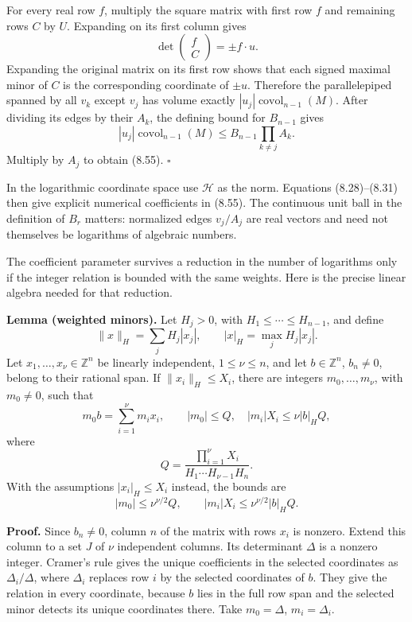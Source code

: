 \documentclass[
  11pt,
  a4paper,
]{article}
\begin{document}
For every real row \(f\), multiply the square matrix with first row
\(f\) and remaining rows \(C\) by \(U\). Expanding on its first column
gives \[
\det\begin{pmatrix}f\\C\end{pmatrix}
=\pm f\cdot u.
\] Expanding the original matrix on its first row shows that each signed
maximal minor of \(C\) is the corresponding coordinate of \(\pm u\).
Therefore the parallelepiped spanned by all \(v_k\) except \(v_j\) has
volume exactly \(|u_j|\operatorname{covol}_{n-1}(M)\). After dividing
its edges by their \(A_k\), the defining bound for \(B_{n-1}\) gives \[
|u_j|\operatorname{covol}_{n-1}(M)
\le B_{n-1}\prod_{k\ne j}A_k.
\] Multiply by \(A_j\) to obtain (8.55). \(\square\)

In the logarithmic coordinate space use \(\mathcal H\) as the norm.
Equations (8.28)--(8.31) then give explicit numerical coefficients in
(8.55). The continuous unit ball in the definition of \(B_r\) matters:
normalized edges \(v_j/A_j\) are real vectors and need not themselves be
logarithms of algebraic numbers.

The coefficient parameter survives a reduction in the number of
logarithms only if the integer relation is bounded with the same
weights. Here is the precise linear algebra needed for that reduction.

\textbf{Lemma (weighted minors).} Let \(H_j>0\), with
\(H_1\le\cdots\le H_{n-1}\), and define \[
\|x\|_H=\sum_jH_j|x_j|,\qquad
|x|_H=\max_jH_j|x_j|.
\] Let \(x_1,\ldots,x_\nu\in\mathbb Z^n\) be linearly independent,
\(1\le\nu\le n\), and let \(b\in\mathbb Z^n\), \(b_n\ne0\), belong to
their rational span. If \(\|x_i\|_H\le X_i\), there are integers
\(m_0,\ldots,m_\nu\), with \(m_0\ne0\), such that \[
m_0b=\sum_{i=1}^\nu m_ix_i,\qquad
|m_0|\le Q,\quad |m_i|X_i\le\nu|b|_H Q,
\] where \[
Q=\frac{\prod_{i=1}^\nu X_i}{H_1\cdots H_{\nu-1}H_n}.
\] With the assumptions \(|x_i|_H\le X_i\) instead, the bounds are \[
|m_0|\le\nu^{\nu/2}Q,\qquad
|m_i|X_i\le\nu^{\nu/2}|b|_H Q.
\]

\textbf{Proof.} Since \(b_n\ne0\), column \(n\) of the matrix with rows
\(x_i\) is nonzero. Extend this column to a set \(J\) of \(\nu\)
independent columns. Its determinant \(\Delta\) is a nonzero integer.
Cramer's rule gives the unique coefficients in the selected coordinates
as \(\Delta_i/\Delta\), where \(\Delta_i\) replaces row \(i\) by the
selected coordinates of \(b\). They give the relation in every
coordinate, because \(b\) lies in the full row span and the selected
minor detects its unique coordinates there. Take \(m_0=\Delta\),
\(m_i=\Delta_i\).
\end{document}
